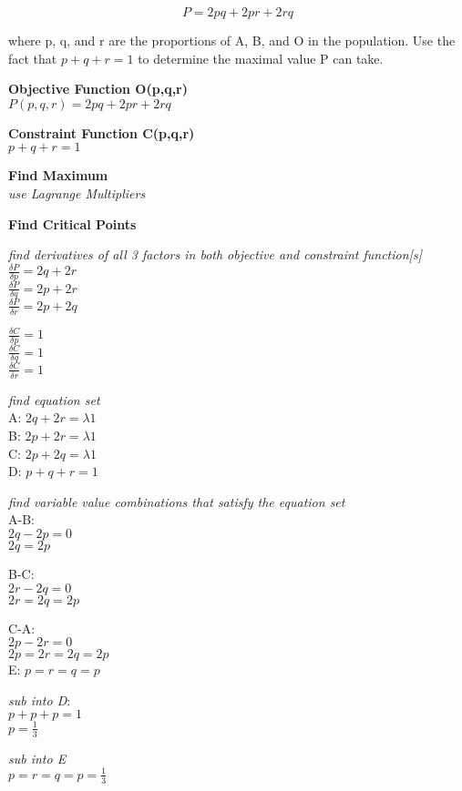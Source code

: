 \documentclass[11pt]{article}
\begin{document}
\[P = 2pq + 2pr + 2rq\]

where p, q, and r are the proportions of A, B, and O in the population.
Use the fact that \(p + q + r = 1\) to determine the maximal value P can
take.

    \textbf{Objective Function O(p,q,r)}\\
\(P(p,q,r) = 2pq + 2pr + 2rq\)

\textbf{Constraint Function C(p,q,r)}\\
\(p+q+r=1\)

\textbf{Find Maximum}\\
\emph{use Lagrange Multipliers}

\textbf{Find Critical Points}

\emph{find derivatives of all 3 factors in both objective and constraint
function{[}s{]}}\\
\(\frac{\delta P}{\delta p} = 2q + 2r\)\\
\(\frac{\delta P}{\delta q} = 2p + 2r\)\\
\(\frac{\delta P}{\delta r} = 2p + 2q\)

\(\frac{\delta C}{\delta p} =1\)\\
\(\frac{\delta C}{\delta q} =1\)\\
\(\frac{\delta C}{\delta r} =1\)

\emph{find equation set}\\
A: \(2q + 2r = \lambda 1\)\\
B: \(2p + 2r = \lambda 1\)\\
C: \(2p + 2q = \lambda 1\)\\
D: \(p+q+r=1\)

\emph{find variable value combinations that satisfy the equation set}\\
A-B:\\
\(2q-2p = 0\)\\
\(2q = 2p\)

B-C:\\
\(2r -2q = 0\)\\
\(2r= 2q = 2p\)

C-A:\\
\(2p -2r = 0\)\\
\(2p = 2r = 2q = 2p\)\\
E: \(p = r = q = p\)

\emph{sub into D}:\\
\(p+p+p=1\)\\
\(p=\frac{1}{3}\)

\emph{sub into E}\\
\(p = r = q = p = \frac{1}{3}\)
\end{document}
